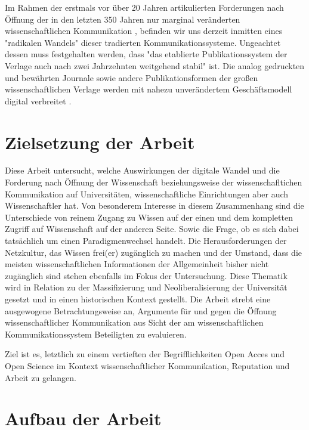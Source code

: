 Im Rahmen der erstmals vor über 20 Jahren artikulierten Forderungen nach Öffnung der in den letzten 350 Jahren nur marginal veränderten wissenschaftlichen Kommunikation \cite{poynder_2011_suber bzw suchen}, befinden wir uns derzeit inmitten eines "radikalen Wandels" \cite{poynder_2011_suber} dieser tradierten Kommunikationssysteme. Ungeachtet dessen muss festgehalten werden, dass "das etablierte Publikationssystem der Verlage auch nach zwei Jahrzehnten weitgehend stabil" \cite{Hanekop_2014} ist. Die analog gedruckten und bewährten Journale sowie andere Publikationsformen der großen wissenschaftlichen Verlage werden mit nahezu unverändertem Geschäftsmodell digital verbreitet \cite{Hanekop_2014} \cite{boai_2012}.

\section{Zielsetzung der Arbeit} 

Diese Arbeit untersucht, welche Auswirkungen der digitale Wandel und die Forderung nach Öffnung der Wissenschaft beziehungsweise der wissenschafltichen Kommunikation auf Universitäten, wissenschaftliche Einrichtungen aber auch Wissenschaftler hat. Von besonderem Interesse in diesem Zusammenhang sind die Unterschiede von reinem Zugang zu Wissen auf der einen und dem kompletten Zugriff auf Wissenschaft auf der anderen Seite. Sowie die Frage, ob es sich dabei tatsächlich um einen Paradigmenwechsel handelt. Die Herausforderungen der Netzkultur, das Wissen frei(er) zugänglich zu machen und der Umstand, dass die meisten wissenschaftlichen Informationen der Allgemeinheit bisher nicht zugänglich sind \cite{cite:6} stehen ebenfalls im Fokus der Untersuchung. Diese Thematik wird in Relation zu der Massifizierung und Neoliberalisierung der Universität gesetzt und in einen historischen Kontext gestellt. Die Arbeit strebt eine ausgewogene Betrachtungsweise an, Argumente für und gegen die Öffnung wissenschaftlicher Kommunikation aus Sicht der am wissenschaftlichen Kommunikationssystem Beteiligten zu evaluieren.

Ziel ist es, letztlich zu einem vertieften der Begrifflichkeiten Open Acces und Open Science im Kontext wissenschaftlicher Kommunikation, Reputation und Arbeit zu gelangen.

\section{Aufbau der Arbeit} 


